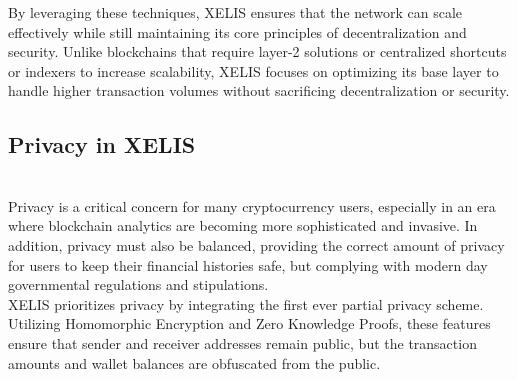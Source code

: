 \documentclass[12pt,a4paper,twocolumn]{article}
\begin{document}
By leveraging these techniques, XELIS ensures that the network can scale effectively while still maintaining its core principles of decentralization and security. Unlike blockchains that require layer-2 solutions or centralized shortcuts or indexers to increase scalability, XELIS focuses on optimizing its base layer to handle higher transaction volumes without sacrificing decentralization or security.\\


\subsection{Privacy in XELIS}\\

Privacy is a critical concern for many cryptocurrency users, especially in an era where blockchain analytics are becoming more sophisticated and invasive. In addition, privacy must also be balanced, providing the correct amount of privacy for users to keep their financial histories safe, but complying with modern day governmental regulations and stipulations.\\

XELIS prioritizes privacy by integrating the first ever partial privacy scheme. Utilizing Homomorphic Encryption and Zero Knowledge Proofs, these features ensure that sender and receiver addresses remain public, but the transaction amounts and wallet balances are obfuscated from the public.\\
\end{document}
